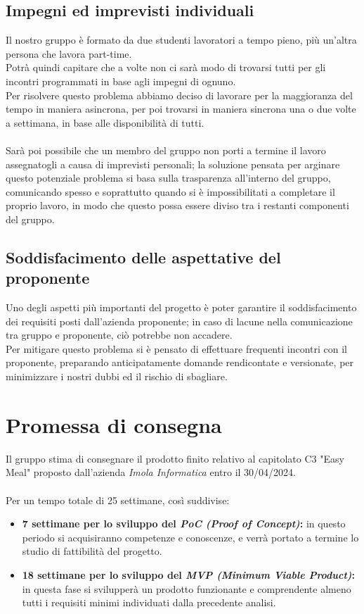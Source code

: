 \documentclass[a4paper, 11pt]{article}
\begin{document}
\subsection{Impegni ed imprevisti individuali}
Il nostro gruppo è formato da due studenti lavoratori a tempo pieno, più un'altra persona che lavora part-time. \\
Potrà quindi capitare che a volte non ci sarà modo di trovarsi tutti per gli incontri programmati in base agli impegni di ognuno. \\
Per risolvere questo problema abbiamo deciso di lavorare per la maggioranza del tempo in maniera asincrona, per poi trovarsi in maniera sincrona una o due volte a settimana, in base alle disponibilità di tutti. \\ \\
Sarà poi possibile che un membro del gruppo non porti a termine il lavoro assegnatogli a causa di imprevisti personali; la soluzione pensata per arginare questo potenziale problema si basa sulla trasparenza all'interno del gruppo, comunicando spesso e soprattutto quando si è impossibilitati a completare il proprio lavoro, in modo che questo possa essere diviso tra i restanti componenti del gruppo.

\subsection{Soddisfacimento delle aspettative del proponente}
Uno degli aspetti più importanti del progetto è poter garantire il soddisfacimento dei requisiti posti dall'azienda proponente; in caso di lacune nella comunicazione tra gruppo e proponente, ciò potrebbe non accadere. \\
Per mitigare questo problema si è pensato di effettuare frequenti incontri con il proponente, preparando anticipatamente domande rendicontate e versionate, per minimizzare i nostri dubbi ed il rischio di sbagliare.

\vspace{100pt}

\section{Promessa di consegna}
Il gruppo stima di consegnare il prodotto finito relativo al capitolato C3 "Easy Meal" proposto dall'azienda \textit{Imola Informatica} entro il 30/04/2024. \\ \\
Per un tempo totale di 25 settimane, così suddivise:
\begin{itemize}
    \item \textbf{7 settimane per lo sviluppo del \textit{PoC (Proof of Concept)}:} in questo periodo si acquisiranno competenze e conoscenze, e verrà portato a termine lo studio di fattibilità del progetto.
    \item \textbf{18 settimane per lo sviluppo del \textit{MVP (Minimum Viable Product)}:} in questa fase si svilupperà un prodotto funzionante e comprendente almeno tutti i requisiti minimi individuati dalla precedente analisi.
\end{itemize}
\end{document}
